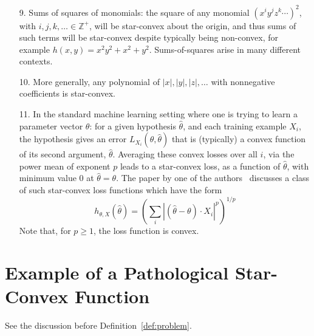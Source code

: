 \documentclass[11pt,letter]{article}
\numberwithin{nTheorems}{section}
\begin{document}
\begin{itemize}
  \item[9.] Sums of squares of monomials: the square of any monomial $(x^i y^j z^k\cdots)^2$, with $i,j,k,\ldots\in\mathbb{Z}^+$, will be star-convex about the origin, and thus sums of such terms will be star-convex despite typically being non-convex, for example $h(x,y)=x^2y^2+x^2+y^2$. Sums-of-squares arise in many different contexts.
  \item[10.] More generally, any polynomial of $|x|,|y|,|z|,\ldots$ with nonnegative coefficients is star-convex.
  \item[11.] In the standard machine learning setting where one is trying to learn a parameter vector $\theta$: for a given hypothesis $\hat{\theta}$, and each training example $X_i$, the hypothesis gives an error $L_{X_i}(\theta,\hat{\theta})$ that is (typically) a convex function of its second argument, $\hat{\theta}$. Averaging these convex losses over all $i$, via the power mean of exponent $p$ leads to a star-convex loss, as a function of $\hat{\theta}$, with minimum value 0 at $\hat{\theta}=\theta$. The paper by one of the authors~\cite{Valiant:2014} discusses a class of such star-convex loss functions which have the form \[h_{\theta,X}(\hat{\theta})=\left(\sum_i |(\hat{\theta}-\theta)\cdot X_i|^p\right)^{1/p}\]
Note that, for $p \ge 1$, the loss function is convex.
\end{itemize}

\section{Example of a Pathological Star-Convex Function}\label{ap:examples}

See the discussion before Definition~\ref{def:problem}.
\end{document}
